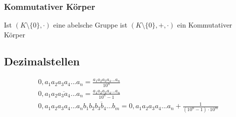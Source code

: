 \documentclass[a4paper]{scrartcl}
\begin{document}
\subsubsection{Kommutativer Körper}
Ist $(K \setminus \{0\}, \cdot)$ eine abelsche Gruppe ist $(K \setminus \{0\}, +, \cdot )$ ein Kommutativer Körper

\subsection{Dezimalstellen}
\begin{align}
0,a_1 a_2 a_3 a_4...a_n = \frac{a_1 a_2 a_3 a_4...a_n}{10^n} \\
0,\overline{a_1 a_2 a_3 a_4...a_n} = \frac{a_1 a_2 a_3 a_4...a_n}{10^n-1} \\
0,a_1 a_2 a_3 a_4...a_n \overline{b_1 b_2 b_3 b_4...b_m}= 0,a_1 a_2 a_3 a_4...a_n + \frac{1}{(10^n-1) \cdot 10^m}
\end{align}
\end{document}
